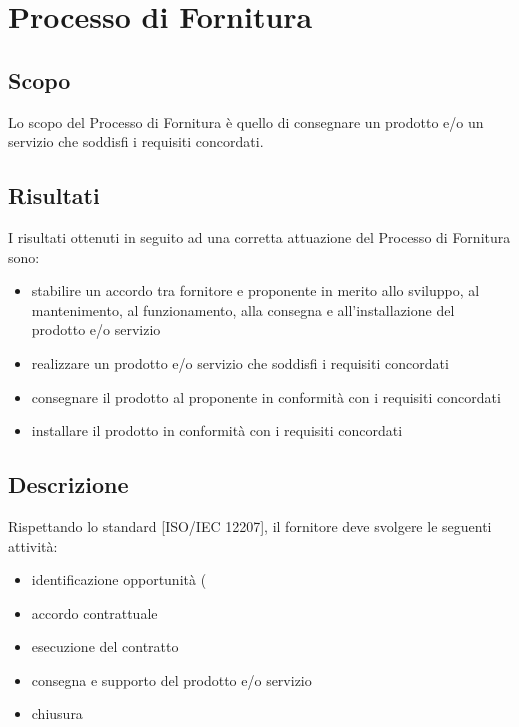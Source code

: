 \documentclass[../NormeDiProgetto.tex]{subfiles}
\begin{document}
	\section{Processo di Fornitura}
		\subsection{Scopo}
			Lo scopo del Processo di Fornitura è quello di consegnare un prodotto e/o un servizio che soddisfi i requisiti concordati.
		\subsection{Risultati}
			I risultati ottenuti in seguito ad una corretta attuazione del Processo di Fornitura sono:
			\begin{itemize}
				\item stabilire un accordo tra fornitore e proponente in merito allo sviluppo, al mantenimento, al funzionamento, alla consegna e all'installazione del prodotto e/o servizio
				\item realizzare un prodotto e/o servizio che soddisfi i requisiti concordati
				\item consegnare il prodotto al proponente in conformità con i requisiti concordati
				\item installare il prodotto in conformità con i requisiti concordati
			\end{itemize}
		\subsection{Descrizione}
			Rispettando lo standard [ISO/IEC 12207], il fornitore deve svolgere le seguenti attività:
			\begin{itemize}
				\item identificazione opportunità (\studiodifattibilita\)
				\item accordo contrattuale
				\item esecuzione del contratto
				\item consegna e supporto del prodotto e/o servizio
				\item chiusura
			\end{itemize}
\end{document}
